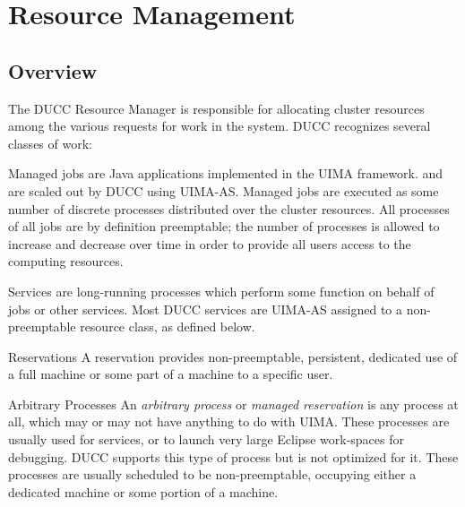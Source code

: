 \ifpdf
\else
{}
\fi
\chapter{Resource Management}
\label{chap:rm}
    \section{Overview}

    The DUCC Resource Manager is responsible for allocating cluster resources among the various 
    requests for work in the system. DUCC recognizes several classes of work: 

    \begin{description}
        \item[Managed Jobs]
            Managed jobs are Java applications implemented in the UIMA framework. 
            and are scaled out by DUCC using UIMA-AS. Managed jobs are executed as some 
            number of discrete processes distributed over the cluster resources. All processes of all jobs 
            are by definition preemptable; the number of processes is allowed to increase and decrease 
            over time in order to provide all users access to the computing resources. 
        \item[Services]
            Services are long-running processes which perform some function on behalf of 
            jobs or other services. Most DUCC services are UIMA-AS assigned to a non-preemptable 
            resource class, as defined below.

        \item{Reservations}
            A reservation provides non-preemptable, persistent, dedicated use of a full machine or
            some part of a machine to a specific user.

        \item{Arbitrary Processes}
            An {\em arbitrary process} or {\em managed reservation} is any process at all, which may
            or may not have anything to do with UIMA.  These processes are usually used for services,
            or to launch very large Eclipse work-spaces for debugging.  DUCC supports this type of 
            process but is not optimized for it.  These processes are usually scheduled to be 
            non-preemptable, occupying either a dedicated machine or some portion of a machine.

      \end{description}
          
